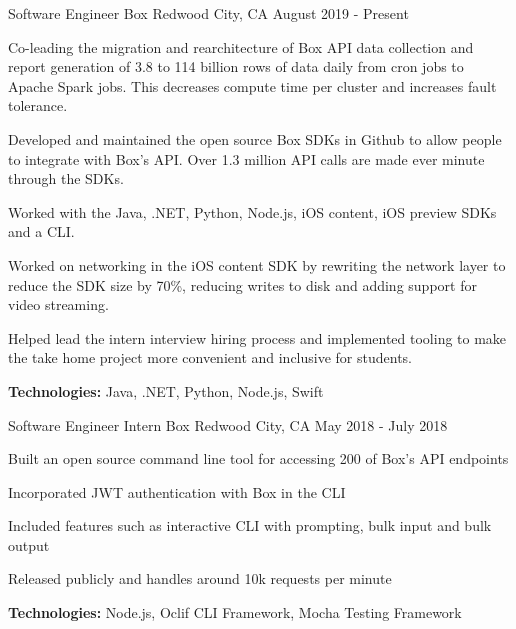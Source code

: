 
\begin{cventries}
  \cventry
    {Software Engineer} %
    {Box} %
    {Redwood City, CA} %
    {August 2019 - Present} %
    {
      \begin{cvitems} %
        \item{Co-leading the migration and rearchitecture of Box API data collection and report generation of 3.8 to 114 billion rows of data daily from cron jobs to Apache Spark jobs. This decreases compute time per cluster and increases fault tolerance.}
        \item{Developed and maintained the open source Box SDKs in Github to allow people to integrate with Box's API. Over 1.3 million API calls are made ever minute through the SDKs.}
        \item{Worked with the Java, .NET, Python, Node.js, iOS content, iOS preview SDKs and a CLI.}
        \item{Worked on networking in the iOS content SDK by rewriting the network layer to reduce the SDK size by 70\%, reducing writes to disk and adding support for video streaming.}
        \item{Helped lead the intern interview hiring process and implemented tooling to make the take home project more convenient and inclusive for students.}
        {\setlength \itemindent{-2ex} \itemsep2pt \item[] \textbf{Technologies:} Java, .NET, Python, Node.js, Swift}
        {\setlength \itemindent{-2ex} \itemsep2pt \item[] 
        \href{https://sujaygarlanka.com/experience.html\#box}{ \faInfoCircle \textbf{\color{awesome}{ Details}}}
        \href{https://github.com/box/sdks}{ \faGithub \textbf{\color{awesome}{ Code}}}}
      \end{cvitems}
    }
    
  \cventry
    {Software Engineer Intern} %
    {Box} %
    {Redwood City, CA} %
    {May 2018 - July 2018} %
    {
      \begin{cvitems} %
        \item{Built an open source command line tool for accessing 200 of Box’s API endpoints}
        \item{Incorporated JWT authentication with Box in the CLI}
        \item{Included features such as interactive CLI with prompting, bulk input and bulk output}
        \item{Released publicly and handles around 10k requests per minute}
        {\setlength \itemindent{-2ex} \itemsep2pt \item[] \textbf{Technologies:} Node.js, Oclif CLI Framework, Mocha Testing Framework}
        {\setlength \itemindent{-2ex} \itemsep2pt \item[]  \href{https://sujaygarlanka.com/experience.html\#internship}{ \faPlayCircle \textbf{\color{awesome}{ Demo}}} \href{https://github.com/box/boxcli}{ \faGithub \textbf{\color{awesome}{ Code}}}}
      \end{cvitems}
    }


\end{cventries}
